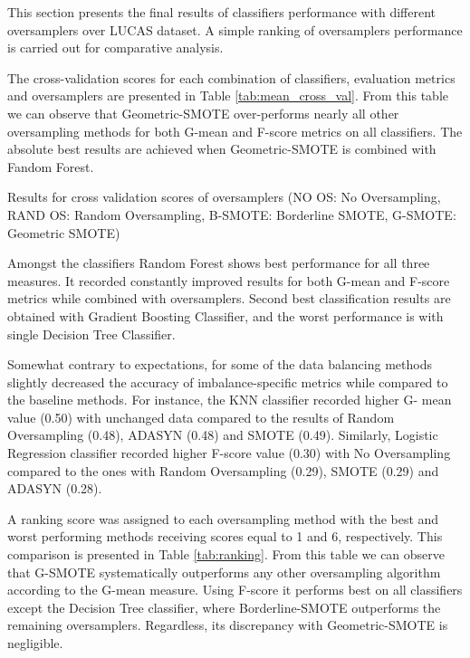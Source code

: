 \documentclass[parskip=full]{scrartcl}
\begin{document}
This section presents the final results of classifiers performance with
different oversamplers over LUCAS dataset. A simple ranking of oversamplers
performance is carried out for comparative analysis.

The cross-validation scores for each combination of classifiers, evaluation
metrics and oversamplers are presented in Table \ref{tab:mean_cross_val}.
From this table we can observe that Geometric-SMOTE over-performs nearly all
other oversampling methods for both G-mean and F-score metrics on all
classifiers. The absolute best results are achieved when Geometric-SMOTE is
combined with Fandom Forest.

\begin{table}[H]
	\centering
	\caption{\label{tab:mean_cross_val}Results for cross validation scores
		of oversamplers (NO OS: No Oversampling, RAND OS: Random Oversampling, B-SMOTE: Borderline SMOTE, G-SMOTE: Geometric SMOTE)}
\end{table}

Amongst the classifiers Random Forest shows best performance for all three
measures. It recorded constantly improved results for both G-mean and F-score
metrics while combined with oversamplers. Second best classification results
are obtained with Gradient Boosting Classifier, and the worst performance is
with single Decision Tree Classifier.

Somewhat contrary to expectations, for some of the data balancing methods
slightly decreased the accuracy of imbalance-specific metrics while compared
to the baseline methods. For instance, the KNN classifier recorded higher G-
mean value (0.50) with unchanged data compared to the results of Random
Oversampling (0.48), ADASYN (0.48) and SMOTE (0.49). Similarly, Logistic
Regression classifier recorded higher F-score value (0.30) with No Oversampling
compared to the ones with Random Oversampling (0.29), SMOTE (0.29) and ADASYN
(0.28).

A ranking score was assigned to each oversampling method with the best and
worst performing methods receiving scores equal to 1 and 6, respectively. This
comparison is presented in Table \ref{tab:ranking}. From this table we can
observe that G-SMOTE systematically outperforms any other oversampling
algorithm according to the G-mean measure. Using F-score it performs best on
all classifiers except the Decision Tree classifier, where Borderline-SMOTE
outperforms the remaining oversamplers. Regardless, its discrepancy with
Geometric-SMOTE is negligible.
\end{document}
